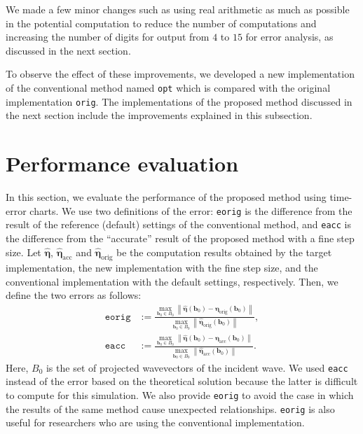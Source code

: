 \documentclass[preprint, 5p, times, sort&compress]{elsarticle}
\def\vecb{\bm{b}}
\def\veta{\bm{\eta}}
\begin{document}
        We made a few minor changes such as using real arithmetic as much as possible
        in the potential computation to reduce the number of computations and
        increasing the number of digits for output from $4$ to $15$ for error analysis, as discussed in the next section.

        To observe the effect of these improvements, we developed a new implementation of the conventional method named \texttt{opt}
        which is compared with the original implementation \texttt{orig}.
        The implementations of the proposed method discussed in the next section include the improvements explained in this subsection.


        \section{Performance evaluation}
        In this section, we evaluate the performance of the proposed method using time-error charts.
        We use two definitions of the error:
        \texttt{eorig} is the difference from the result of the reference (default) settings of the conventional method, and
        \texttt{eacc} is the difference from the ``accurate'' result of the proposed method with a fine step size.
        Let $\hat{\veta}$, $\hat{\veta}_\mathrm{acc}$ and $\hat{\veta}_\mathrm{orig}$
        be the computation results obtained by the target implementation, the new implementation with the fine step size,
        and the conventional implementation with the default settings, respectively.
        Then, we define the two errors as follows:
        \begin{align}
                \mathtt{eorig} &:= \frac{\max_{\vecb_0 \in B_0}\left\|\hat{\veta}(\vecb_0)-\veta_\mathrm{orig}(\vecb_0)\right\|}{\max_{\vecb_0 \in B_0} \left\|\hat{\veta}_\mathrm{orig}(\vecb_0)\right\|}, \\
                \mathtt{eacc} &:= \frac{\max_{\vecb_0 \in B_0}\left\|\hat{\veta}(\vecb_0)-\veta_\mathrm{acc}(\vecb_0)\right\|}{\max_{\vecb_0 \in B_0} \left\|\hat{\veta}_\mathrm{acc}(\vecb_0)\right\|}.
        \end{align}
        Here, $B_0$ is the set of projected wavevectors of the incident wave.
        We used \texttt{eacc} instead of the error based on the theoretical solution
        because the latter is difficult to compute for this simulation.
        We also provide \texttt{eorig} to avoid the case
        in which the results of the same method cause unexpected relationships.
        \texttt{eorig} is also useful for researchers who are using the conventional implementation.
\end{document}
